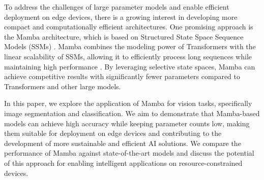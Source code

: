 \documentclass[conference]{IEEEtran}
\begin{document}
To address the challenges of large parameter models and enable efficient deployment on edge devices, there is a growing interest in developing more compact and computationally efficient architectures. One promising approach is the Mamba architecture, which is based on Structured State Space Sequence Models (SSMs) \cite{gu2022efficiently}. Mamba combines the modeling power of Transformers with the linear scalability of SSMs, allowing it to efficiently process long sequences while maintaining high performance \cite{gu2023mamba}. By leveraging selective state spaces, Mamba can achieve competitive results with significantly fewer parameters compared to Transformers and other large models.

In this paper, we explore the application of Mamba for vision tasks, specifically image segmentation and classification. We aim to demonstrate that Mamba-based models can achieve high accuracy while keeping parameter counts low, making them suitable for deployment on edge devices and contributing to the development of more sustainable and efficient AI solutions. We compare the performance of Mamba against state-of-the-art models and discuss the potential of this approach for enabling intelligent applications on resource-constrained devices.
\end{document}
